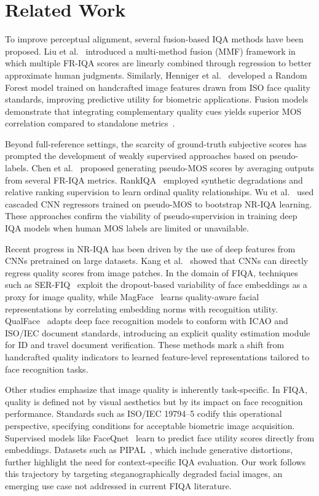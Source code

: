 \section{Related Work}

To improve perceptual alignment, several fusion-based IQA methods have been proposed. Liu et al.~\cite{liu2013mmf} introduced a multi-method fusion (MMF) framework in which multiple FR-IQA scores are linearly combined through regression to better approximate human judgments. Similarly, Henniger et al.~\cite{henniger2020biosig} developed a Random Forest model trained on handcrafted image features drawn from ISO face quality standards, improving predictive utility for biometric applications. Fusion models demonstrate that integrating complementary quality cues yields superior MOS correlation compared to standalone metrics~\cite{Robinson2020}.

Beyond full-reference settings, the scarcity of ground-truth subjective scores has prompted the development of weakly supervised approaches based on pseudo-labels. Chen et al.~\cite{chen2021pseudo} proposed generating pseudo-MOS scores by averaging outputs from several FR-IQA metrics. RankIQA~\cite{liu2017rankiqa} employed synthetic degradations and relative ranking supervision to learn ordinal quality relationships. Wu et al.~\cite{wu2020cnn} used cascaded CNN regressors trained on pseudo-MOS to bootstrap NR-IQA learning. These approaches confirm the viability of pseudo-supervision in training deep IQA models when human MOS labels are limited or unavailable.

Recent progress in NR-IQA has been driven by the use of deep features from CNNs pretrained on large datasets. Kang et al.~\cite{kang2014cnn} showed that CNNs can directly regress quality scores from image patches. In the domain of FIQA, techniques such as SER-FIQ~\cite{terhorst2020serfiq} exploit the dropout-based variability of face embeddings as a proxy for image quality, while MagFace~\cite{meng2021magface} learns quality-aware facial representations by correlating embedding norms with recognition utility. QualFace~\cite{tremoco2021qualface} adapts deep face recognition models to conform with ICAO and ISO/IEC document standards, introducing an explicit quality estimation module for ID and travel document verification. These methods mark a shift from handcrafted quality indicators to learned feature-level representations tailored to face recognition tasks.


Other studies emphasize that image quality is inherently task-specific. In FIQA, quality is defined not by visual aesthetics but by its impact on face recognition performance. Standards such as ISO/IEC 19794--5 codify this operational perspective, specifying conditions for acceptable biometric image acquisition. Supervised models like FaceQnet~\cite{hernandez2019faceqnet} learn to predict face utility scores directly from embeddings. Datasets such as PIPAL~\cite{jin2020pipal}, which include generative distortions, further highlight the need for context-specific IQA evaluation. Our work follows this trajectory by targeting steganographically degraded facial images, an emerging use case not addressed in current FIQA literature.
